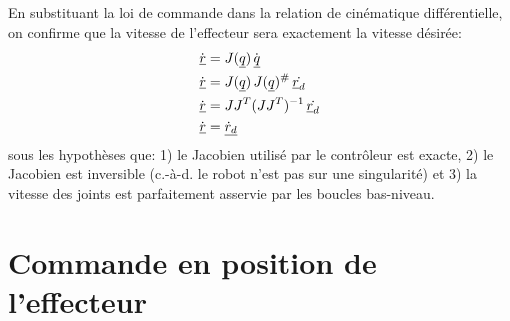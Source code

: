 En substituant la loi de commande dans la relation de cinématique différentielle, on confirme que la vitesse de l'effecteur sera exactement la vitesse désirée:
\begin{align}
	\dot{\underline{r}} &= J(\underline{q}) \, \dot{\underline{q}} \\
	\dot{\underline{r}} &= J(\underline{q}) \, J(\underline{q})^{\#} \, \dot{\underline{r}_d} \\
	\dot{\underline{r}} &= J J^T (J J^T)^{-1} \, \dot{\underline{r}_d} \\
	\dot{\underline{r}} &=  \underline{\dot{r}_d}
\end{align}
sous les hypothèses que: 1) le Jacobien utilisé par le contrôleur est exacte, 2) le Jacobien est inversible (c.-à-d. le robot n'est pas sur une singularité) et 3) la vitesse des joints est parfaitement asservie par les boucles bas-niveau.




\newpage
\section{Commande en position de l'effecteur}
\label{sec:positioncontrol}


